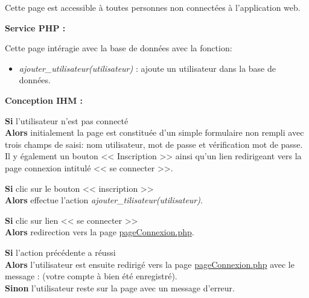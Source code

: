 			\begin{paragraphe}
				Cette page est accessible à toutes personnes non connectées à l'application web.
			\end{paragraphe}

			\begin{paragraphe}
				\textbf{Service PHP :}
			\end{paragraphe}

			\begin{paragraphe}
			    Cette page intéragie avec la base de données avec la fonction:
				\begin{itemize}
					\item \emph{ajouter\_utilisateur(utilisateur)} : ajoute un utilisateur dans la base de données.
				\end{itemize}
			\end{paragraphe}

			\begin{paragraphe}
				\textbf{Conception IHM :}
			\end{paragraphe}

			\begin{paragraphe}
				\textbf{Si} l'utilisateur n'est pas connecté \\
				\textbf{Alors} initialement la page est constituée d'un simple formulaire non rempli avec trois champs de saisi: nom utilisateur, mot de passe et vérification mot de passe.
				Il y également un bouton << Inscription >> ainsi qu'un lien redirigeant vers la page connexion intitulé << se connecter >>.
			\end{paragraphe}

			\begin{paragraphe}
				\textbf{Si} clic sur le bouton << inscription >> \\
				\textbf{Alors} effectue l'action \emph{ajouter\_tilisateur(utilisateur)}.
			\end{paragraphe}

           \begin{paragraphe}
                \textbf{Si} clic sur lien << se connecter >> \\
                \textbf{Alors} redirection vers la page \underline{pageConnexion.php}.
            \end{paragraphe}

			\begin{paragraphe}
				\textbf{Si} l'action précédente a réussi \\
				\textbf{Alors} l'utilisateur est ensuite redirigé vers la page \underline{pageConnexion.php} avec le message : (votre compte à bien été enregistré). \\
				\textbf{Sinon} l'utilisateur reste sur la page avec un message d'erreur.
			\end{paragraphe}

